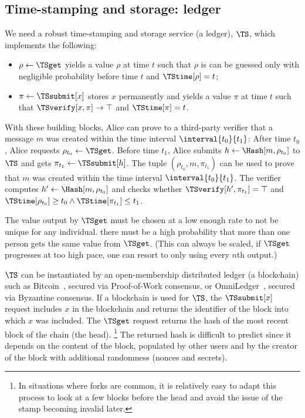 \subsection{Time-stamping and storage: ledger}%
\label{StorageProperties}\label{timestamp}\label{ledger}

We need a robust time-stamping and storage service (\ie a ledger), \(\TS\), 
which implements the following:
\begin{itemize}
  \item \(\rho \gets \TSget\) yields a value \(\rho\) at time \(t\) such that 
    \(\rho\) is can be guessed only with negligible probability before time 
    \(t\) and \(\TStime[\rho] = t\);
  \item \(\pi\gets \TSsubmit[x]\) stores \(x\) permanently and yields a value 
    \(\pi\) at time \(t\) such that \(\TSverify[x, \pi]\to \top\) and 
    \(\TStime[\pi] = t\).
\end{itemize}

With these building blocks, Alice can prove to a third-party verifier that a 
message \(m\) was created within the time interval \(\interval{t_0}{t_1}\):
After time \(t_0\), Alice requests \(\rho_{t_0}\gets \TSget\).
Before time \(t_1\), Alice submits \(h\gets \Hash[m, \rho_{t_0}]\) to \(\TS\) 
and gets \(\pi_{t_1}\gets \TSsubmit[h]\).
The tuple \((\rho_{t_0}, m, \pi_{t_1})\) can be used to prove that \(m\) was 
created within the time interval \(\interval{t_0}{t_1}\).
The verifier computes \(h'\gets \Hash[m, \rho_{t_0}]\) and checks whether 
\(\TSverify[h', \pi_{t_1}] = \top\) and \(\TStime[\rho_{t_0}] \geq t_0\land 
  \TStime[\pi_{t_1}] \leq t_1\).

The value output by \(\TSget\) must be chosen at a low enough rate to not be 
unique for any individual.
\Ie there must be a high probability that more than one person gets the same 
value from \(\TSget\).
(This can always be scaled, if \(\TSget\) progresses at too high pace, one can 
resort to only using every \(n\)th output.)

\(\TS\) can be instantiated by an open-membership distributed ledger (\eg a blockchain) such as Bitcoin~\cite{Bitcoin}, secured via Proof-of-Work consensus, or OmniLedger~\cite{OmniLedger}, secured via Byzantine consensus.
If a blockchain is used for \(\TS\), the \(\TSsubmit[x]\) request includes 
\(x\) in the blockchain and returns the identifier of the block into which 
\(x\) was included.
The \(\TSget\) request returns the hash of the most recent block of the chain 
(\ie the head).%
\footnote{In situations where forks are common, it is relatively easy to adapt this process to look at a few blocks before the head and avoid the issue of the stamp becoming invalid later.}
The returned hash is difficult to predict since it depends on the content of the block, populated by other users and by the creator of the block with additional randomness (\eg nonces and secrets).

